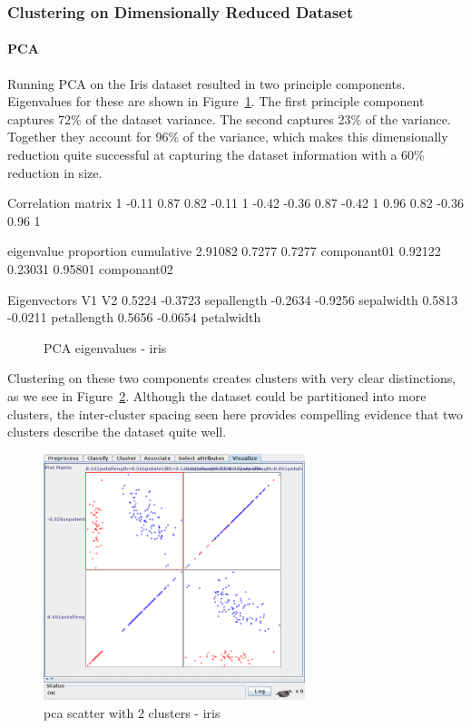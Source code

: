\documentclass{sig-alternate}
\begin{document}
\subsubsection{Clustering on Dimensionally Reduced Dataset}


\paragraph{PCA}
Running PCA on the Iris dataset resulted in two principle components. Eigenvalues for these are shown in Figure~\ref{pca-iris}. The first principle component captures 72\% of the dataset variance. The second captures 23\% of the variance. Together they account for 96\% of the variance, which makes this dimensionally reduction quite successful at capturing the dataset information with a 60\% reduction in size.


\tiny
\begin{verbbox}
Correlation matrix
  1     -0.11   0.87   0.82 
 -0.11   1     -0.42  -0.36 
  0.87  -0.42   1      0.96 
  0.82  -0.36   0.96   1    


eigenvalue  proportion  cumulative
2.91082     0.7277      0.7277    componant01
0.92122     0.23031     0.95801   componant02

Eigenvectors
 V1  V2 
 0.5224 -0.3723 sepallength
-0.2634 -0.9256 sepalwidth
 0.5813 -0.0211 petallength
 0.5656 -0.0654 petalwidth
\end{verbbox}
\normalsize

\begin{figure}[!htbp]
    \centering
    \theverbbox
    \caption{PCA eigenvalues - iris\label{pca-iris}}
\end{figure}


Clustering on these two components creates clusters with very clear distinctions, as we see in Figure~\ref{pca-cluster-scatter-iris}. Although the dataset could be partitioned into more clusters, the inter-cluster spacing seen here provides compelling evidence that two clusters describe the dataset quite well.


\begin{figure}[!htbp]
    \centering
    \includegraphics[width=3in]{part2/iris/pca-cluster-scatter.pdf}
    \caption{pca scatter with 2 clusters - iris\label{pca-cluster-scatter-iris}}
\end{figure} 
\end{document}
